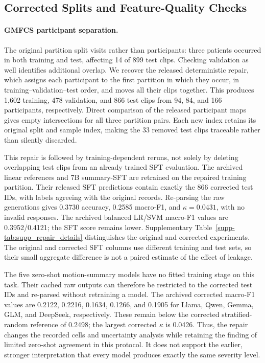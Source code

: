 \subsection{Corrected Splits and Feature-Quality Checks}
\label{sec:review_checks}

\paragraph{GMFCS participant separation.}
The original partition split visits rather than participants: three patients occurred in both training and test, affecting 14 of 899 test clips. Checking validation as well identifies additional overlap. We recover the released deterministic repair, which assigns each participant to the first partition in which they occur, in training--validation--test order, and moves all their clips together. This produces 1,602 training, 478 validation, and 866 test clips from 94, 84, and 166 participants, respectively. Direct comparison of the released participant maps gives empty intersections for all three partition pairs. Each new index retains its original split and sample index, making the 33 removed test clips traceable rather than silently discarded.

This repair is followed by training-dependent reruns, not solely by deleting overlapping test clips from an already trained SFT evaluation. The archived linear references and 7B summary-SFT are retrained on the repaired training partition. Their released SFT predictions contain exactly the 866 corrected test IDs, with labels agreeing with the original records. Re-parsing the raw generations gives 0.3730 accuracy, 0.2585 macro-F1, and $\kappa=0.0431$, with no invalid responses. The archived balanced LR/SVM macro-F1 values are 0.3952/0.4121; the SFT score remains lower. Supplementary Table~\ref{supp-tab:supp_repair_details} distinguishes the original and corrected experiments. The original and corrected SFT columns use different training and test sets, so their small aggregate difference is not a paired estimate of the effect of leakage.

The five zero-shot motion-summary models have no fitted training stage on this task. Their cached raw outputs can therefore be restricted to the corrected test IDs and re-parsed without retraining a model. The archived corrected macro-F1 values are 0.2122, 0.2216, 0.1634, 0.1266, and 0.1905 for Llama, Qwen, Gemma, GLM, and DeepSeek, respectively. These remain below the corrected stratified-random reference of 0.2498; the largest corrected $\kappa$ is 0.0426. Thus, the repair changes the recorded cells and uncertainty analysis while retaining the finding of limited zero-shot agreement in this protocol. It does not support the earlier, stronger interpretation that every model produces exactly the same severity level.

